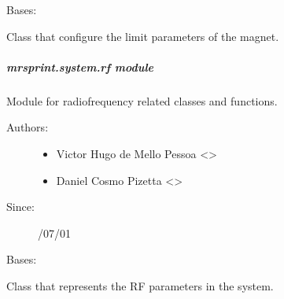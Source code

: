 \documentclass[a4paper,10pt,english]{sphinxmanual}
\begin{document}

\begin{fulllineitems}
\label{\detokenize{autodoc/mrsprint/mrsprint.system:mrsprint.system.magnet.MagnetConfig}}
Bases: 

Class that configure the limit parameters of the magnet.

\end{fulllineitems}



\subparagraph{mrsprint.system.rf module}
\label{\detokenize{autodoc/mrsprint/mrsprint.system:module-mrsprint.system.rf}}\label{\detokenize{autodoc/mrsprint/mrsprint.system:mrsprint-system-rf-module}}
Module for radiofrequency related classes and functions.
\begin{description}
\item[{Authors:}] \leavevmode\begin{itemize}
\item {} 
Victor Hugo de Mello Pessoa \textless{}\textgreater{}

\item {} 
Daniel Cosmo Pizetta \textless{}\textgreater{}

\end{itemize}

\item[{Since:}] /07/01

\end{description}

\begin{fulllineitems}
\label{\detokenize{autodoc/mrsprint/mrsprint.system:mrsprint.system.rf.RF}}
Bases: 

Class that represents the RF parameters in the system.

\end{fulllineitems}
\end{document}
